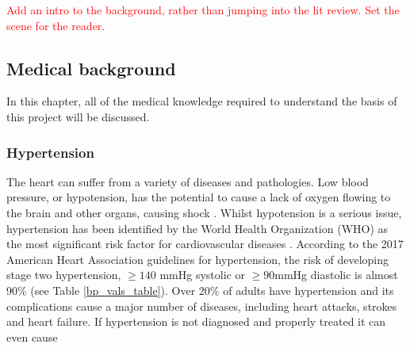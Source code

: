 \textcolor{red}{Add an intro to the background, rather than jumping into the lit review. Set the scene for the reader.}

\subsection{Medical background}
In this chapter, all of the medical knowledge required to 
understand the basis of this project will be discussed.
\subsubsection{Hypertension}
The heart can suffer from a variety of diseases and pathologies. Low blood 
pressure, or hypotension, has the potential to cause  a lack of oxygen 
flowing to the  brain  and  other  organs, causing shock \cite{Tanveer2018}. 
Whilst hypotension is a serious issue, hypertension has been identified by 
the World Health Organization (WHO) as the most significant risk factor for 
cardiovascular diseases \cite{Wang2018}. According to the 2017 American Heart 
Association guidelines for hypertension, the risk of developing stage two 
hypertension, $\ge 140$ mmHg systolic or $\ge 90$mmHg diastolic is almost 
90\% \cite{Bard2019} (see Table \ref{bp_vals_table}). Over 20\% of adults have 
hypertension  and  its  complications  cause  a  major  number  of  
diseases, including heart attacks, strokes and heart failure. If 
hypertension is not diagnosed and properly treated it can even cause 

